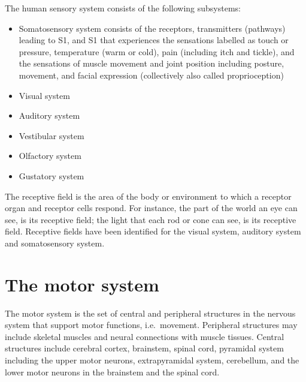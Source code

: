 \documentclass[]{book}
\providecommand{\tightlist}{%
  \setlength{\itemsep}{0pt}\setlength{\parskip}{0pt}}
\begin{document}
The human sensory system consists of the following subsystems:

\begin{itemize}
\tightlist
\item
  Somatosensory system consists of the receptors, transmitters (pathways) leading to S1, and S1 that experiences the sensations labelled as touch or pressure, temperature (warm or cold), pain (including itch and tickle), and the sensations of muscle movement and joint position including posture, movement, and facial expression (collectively also called proprioception)
\item
  Visual system
\item
  Auditory system
\item
  Vestibular system
\item
  Olfactory system
\item
  Gustatory system
\end{itemize}

The receptive field is the area of the body or environment to which a receptor organ and receptor cells respond. For instance, the part of the world an eye can see, is its receptive field; the light that each rod or cone can see, is its receptive field. Receptive fields have been identified for the visual system, auditory system and somatosensory system.

\hypertarget{the-motor-system}{%
\section{The motor system}\label{the-motor-system}}

The motor system is the set of central and peripheral structures in the nervous system that support motor functions, i.e.~movement. Peripheral structures may include skeletal muscles and neural connections with muscle tissues. Central structures include cerebral cortex, brainstem, spinal cord, pyramidal system including the upper motor neurons, extrapyramidal system, cerebellum, and the lower motor neurons in the brainstem and the spinal cord.
\end{document}
